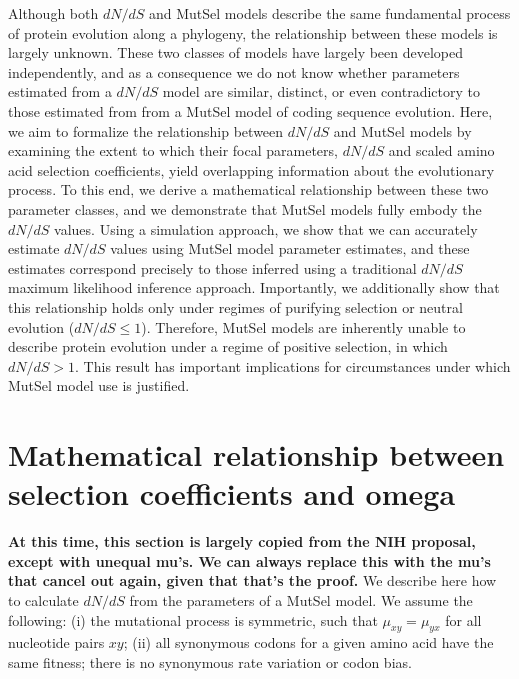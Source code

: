 \documentclass[11pt]{article}
\begin{document}
Although both $dN/dS$ and MutSel models describe the same fundamental process of protein evolution along a phylogeny, the relationship between these models is largely unknown. These two classes of models have largely been developed independently, and as a consequence we do not know whether parameters estimated from a $dN/dS$ model are similar, distinct, or even contradictory to those estimated from from a MutSel model of coding sequence evolution. Here, we aim to formalize the relationship between $dN/dS$ and MutSel models by examining the extent to which their focal parameters, $dN/dS$ and scaled amino acid selection coefficients, yield overlapping information about the evolutionary process. To this end, we derive a mathematical relationship between these two parameter classes, and we demonstrate that MutSel models fully embody the $dN/dS$ values. Using a simulation approach, we show that we can accurately estimate $dN/dS$ values using MutSel model parameter estimates, and these estimates correspond precisely to those inferred using a traditional $dN/dS$ maximum likelihood inference approach.  Importantly, we additionally show that this relationship holds only under regimes of purifying selection or neutral evolution ($dN/dS \leq 1$). Therefore, MutSel models are inherently unable to describe protein evolution under a regime of positive selection, in which $dN/dS > 1$. This result has important implications for circumstances under which MutSel model use is justified.

 
\section*{Mathematical relationship between selection coefficients and omega}
\textbf{At this time, this section is largely copied from the NIH proposal, except with unequal mu's. We can always replace this with the mu's that cancel out again, given that that's the proof.}
We describe here how to calculate $dN/dS$ from the parameters of a MutSel model. We assume the following: (i) the mutational process is symmetric, such that $\mu_{xy}=\mu_{yx}$ for all nucleotide pairs $xy$; (ii) all synonymous codons for a given amino acid have the same fitness; there is no synonymous rate variation or codon bias.
\end{document}
